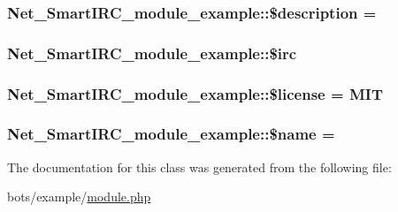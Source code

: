 \subsubsection[{\texorpdfstring{\$description}{$description}}]{\setlength{\rightskip}{0pt plus 5cm}Net\+\_\+\+Smart\+I\+R\+C\+\_\+module\+\_\+example\+::\$description = \textquotesingle{}\textquotesingle{}}\hypertarget{classNet__SmartIRC__module__example_ae66fb76a41befbcdb9ba370dd2a8aafd}{}\label{classNet__SmartIRC__module__example_ae66fb76a41befbcdb9ba370dd2a8aafd}
\subsubsection[{\texorpdfstring{\$irc}{$irc}}]{\setlength{\rightskip}{0pt plus 5cm}Net\+\_\+\+Smart\+I\+R\+C\+\_\+module\+\_\+example\+::\$irc\hspace{0.3cm}{\ttfamily [private]}}\hypertarget{classNet__SmartIRC__module__example_a2d7ea47e77c4dc79aff1c43200e54c82}{}\label{classNet__SmartIRC__module__example_a2d7ea47e77c4dc79aff1c43200e54c82}
\subsubsection[{\texorpdfstring{\$license}{$license}}]{\setlength{\rightskip}{0pt plus 5cm}Net\+\_\+\+Smart\+I\+R\+C\+\_\+module\+\_\+example\+::\$license = \textquotesingle{}M\+IT\textquotesingle{}}\hypertarget{classNet__SmartIRC__module__example_a768e94b6407b8020f8d388507ba3fbe1}{}\label{classNet__SmartIRC__module__example_a768e94b6407b8020f8d388507ba3fbe1}
\subsubsection[{\texorpdfstring{\$name}{$name}}]{\setlength{\rightskip}{0pt plus 5cm}Net\+\_\+\+Smart\+I\+R\+C\+\_\+module\+\_\+example\+::\$name = \textquotesingle{}\textquotesingle{}}\hypertarget{classNet__SmartIRC__module__example_aaebd09582fd081d9afff44777c85c8d8}{}\label{classNet__SmartIRC__module__example_aaebd09582fd081d9afff44777c85c8d8}


The documentation for this class was generated from the following file\+:\begin{DoxyCompactItemize}
\item 
bots/example/\hyperlink{example_2module_8php}{module.\+php}\end{DoxyCompactItemize}
